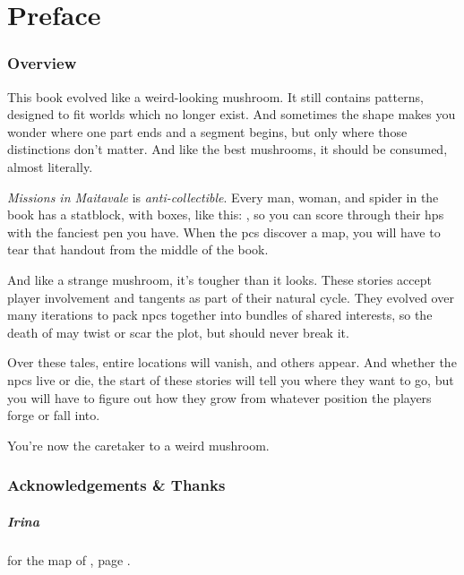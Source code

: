 \chapter{Preface}

\begin{multicols}{2}

\subsection*{Overview}

This book evolved like a weird-looking mushroom.
It still contains patterns, designed to fit worlds which no longer exist.
And sometimes the shape makes you wonder where one part ends and a segment begins, but only where those distinctions don't matter.
And like the best mushrooms, it should be consumed, almost literally.

\randomdozen
\textit{Missions in Maitavale} is \emph{anti-collectible}.
Every man, woman, and spider in the book has a statblock, with  boxes, like this: \setcounter{wounds}{3} \hpStat, so you can score through their \glspl{hp} with the fanciest pen you have.
When the \glspl{pc} discover a map, you will have to tear that handout from the middle of the book.
\setcounter{wounds}{0}

And like a strange mushroom, it's tougher than it looks.
These stories accept player involvement and tangents as part of their natural cycle.
They evolved over many iterations to pack \glspl{npc} together into bundles of shared interests, so the death of  may twist or scar the plot, but should never break it.

Over these tales, entire locations will vanish, and others appear.
And whether the \glspl{npc} live or die, the start of these stories will tell you where they want to go, but you will have to figure out how they grow from whatever position the players forge or fall into.

You're now the caretaker to a weird mushroom.

\columnbreak

\subsection*{Acknowledgements \& Thanks}

\paragraph{Irina}
for the map of , page \pageref{Irina/greylands}.


\end{multicols}
